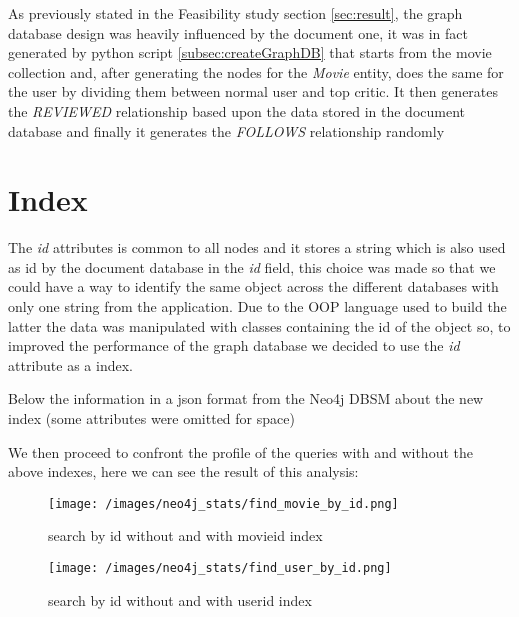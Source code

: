 As previously stated in the Feasibility study section \ref{sec:result}, the graph database design was heavily influenced by the document one, it was in fact generated by python script \cref{subsec:createGraphDB} that starts from the movie collection and, after generating the nodes for the \emph{Movie} entity, does the same for the user by dividing them between normal user and top critic. It then generates the \emph{REVIEWED} relationship based upon the data stored in the document database and finally it generates the \emph{FOLLOWS} relationship randomly

\section{Index}
The \emph{id} attributes is common to all nodes and it stores a string which is also used as id by the document database in the \emph{\textunderscore id} field, this choice was made so that we could have a way to identify the same object across the different databases with only one string from the application. Due to the OOP language used to build the latter the data was manipulated with classes containing the id of the object so, to improved the performance of the graph database we decided to use the \emph{id} attribute as a index. 

Below the information in a json format from the Neo4j DBSM about the new index (some attributes were omitted for space)


We then proceed to confront the profile of the queries with and without the above indexes, here we can see the result of this analysis: 
\begin{figure}[H]
\begin{center}
\texttt{[image: /images/neo4j\_stats/find\_movie\_by\_id.png]}
\caption{search by id without and with movie\textunderscore id \textunderscore index}
\label{fig:movieId}
\end{center}
\end{figure}

\begin{figure}[H]
\begin{center}
\texttt{[image: /images/neo4j\_stats/find\_user\_by\_id.png]}
\caption{search by id without and with user\textunderscore id \textunderscore index}
\label{fig:userId}
\end{center}
\end{figure}


